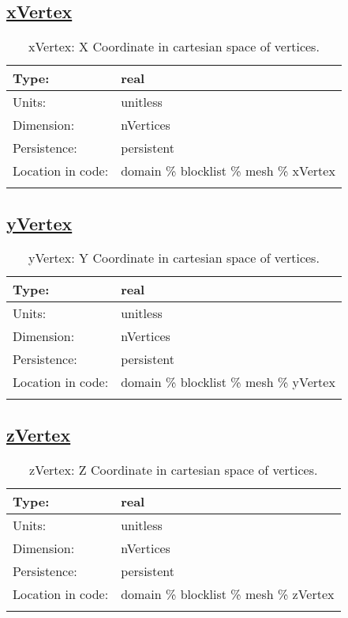 \subsection[xVertex]{\hyperref[sec:var_tab_mesh]{xVertex}}
\label{subsec:var_sec_mesh_xVertex}
\begin{center}
\begin{longtable}{| p{2.0in} | p{4.0in} |}
        \hline 
        Type: & real \\
        \hline 
        Units: & \si{unitless} \\
        \hline 
        Dimension: & nVertices \\
        \hline 
        Persistence: & persistent \\
        \hline 
         Location in code: & domain \% blocklist \% mesh \% xVertex \\
         \hline 
    \caption{xVertex: X Coordinate in cartesian space of vertices.}
\end{longtable}
\end{center}
\subsection[yVertex]{\hyperref[sec:var_tab_mesh]{yVertex}}
\label{subsec:var_sec_mesh_yVertex}
\begin{center}
\begin{longtable}{| p{2.0in} | p{4.0in} |}
        \hline 
        Type: & real \\
        \hline 
        Units: & \si{unitless} \\
        \hline 
        Dimension: & nVertices \\
        \hline 
        Persistence: & persistent \\
        \hline 
         Location in code: & domain \% blocklist \% mesh \% yVertex \\
         \hline 
    \caption{yVertex: Y Coordinate in cartesian space of vertices.}
\end{longtable}
\end{center}
\subsection[zVertex]{\hyperref[sec:var_tab_mesh]{zVertex}}
\label{subsec:var_sec_mesh_zVertex}
\begin{center}
\begin{longtable}{| p{2.0in} | p{4.0in} |}
        \hline 
        Type: & real \\
        \hline 
        Units: & \si{unitless} \\
        \hline 
        Dimension: & nVertices \\
        \hline 
        Persistence: & persistent \\
        \hline 
         Location in code: & domain \% blocklist \% mesh \% zVertex \\
         \hline 
    \caption{zVertex: Z Coordinate in cartesian space of vertices.}
\end{longtable}
\end{center}

